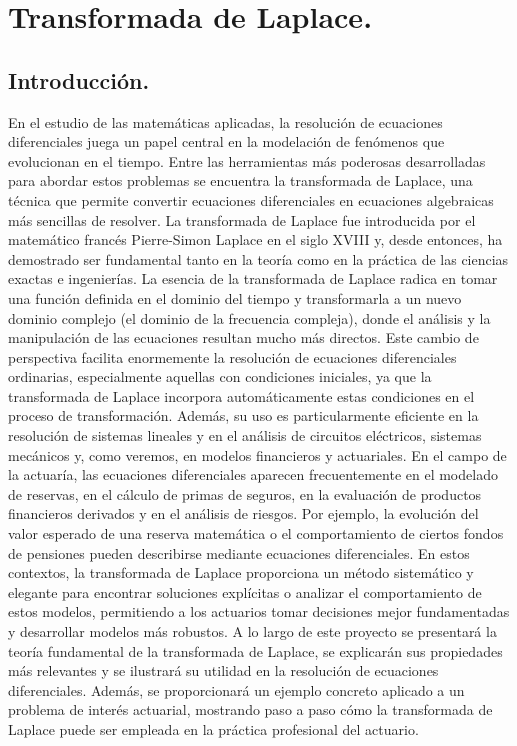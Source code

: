 \documentclass{article}
\theoremstyle{nonumberplain}
\begin{document}
\section*{Transformada de Laplace.}
\subsection*{Introducción.}
En el estudio de las matemáticas aplicadas, la resolución de ecuaciones diferenciales juega un papel central en la modelación de fenómenos que evolucionan en el tiempo. Entre las herramientas más poderosas desarrolladas para abordar estos problemas se encuentra la transformada de Laplace, una técnica que permite convertir ecuaciones diferenciales en ecuaciones algebraicas más sencillas de resolver. La transformada de Laplace fue introducida por el matemático francés Pierre-Simon Laplace en el siglo XVIII y, desde entonces, ha demostrado ser fundamental tanto en la teoría como en la práctica de las ciencias exactas e ingenierías.
La esencia de la transformada de Laplace radica en tomar una función definida en el dominio del tiempo y transformarla a un nuevo dominio complejo (el dominio de la frecuencia compleja), donde el análisis y la manipulación de las ecuaciones resultan mucho más directos. Este cambio de perspectiva facilita enormemente la resolución de ecuaciones diferenciales ordinarias, especialmente aquellas con condiciones iniciales, ya que la transformada de Laplace incorpora automáticamente estas condiciones en el proceso de transformación. Además, su uso es particularmente eficiente en la resolución de sistemas lineales y en el análisis de circuitos eléctricos, sistemas mecánicos y, como veremos, en modelos financieros y actuariales.
En el campo de la actuaría, las ecuaciones diferenciales aparecen frecuentemente en el modelado de reservas, en el cálculo de primas de seguros, en la evaluación de productos financieros derivados y en el análisis de riesgos. Por ejemplo, la evolución del valor esperado de una reserva matemática o el comportamiento de ciertos fondos de pensiones pueden describirse mediante ecuaciones diferenciales. En estos contextos, la transformada de Laplace proporciona un método sistemático y elegante para encontrar soluciones explícitas o analizar el comportamiento de estos modelos, permitiendo a los actuarios tomar decisiones mejor fundamentadas y desarrollar modelos más robustos.
A lo largo de este proyecto se presentará la teoría fundamental de la transformada de Laplace, se explicarán sus propiedades más relevantes y se ilustrará su utilidad en la resolución de ecuaciones diferenciales. Además, se proporcionará un ejemplo concreto aplicado a un problema de interés actuarial, mostrando paso a paso cómo la transformada de Laplace puede ser empleada en la práctica profesional del actuario.
\end{document}
